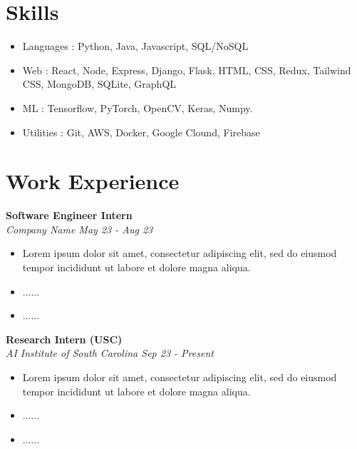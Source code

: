 \documentclass{article}
\begin{document}
\vspace{.1in}
\noindent
\begin{minipage}[t]{0.49\textwidth}

\section*{Skills}
\noindent
\begin{itemize}
    \item Languages : Python, Java, Javascript, SQL/NoSQL
    \item Web : React, Node, Express, Django, Flask, HTML, CSS, Redux, Tailwind CSS, MongoDB, SQLite, GraphQL
    \item ML : Tensorflow, PyTorch, OpenCV, Keras, Numpy.
    \item Utilities : Git, AWS, Docker, Google Clound, Firebase 
\end{itemize} 

\vspace{-.1in}

\section*{Work Experience}
\noindent
\textbf{Software Engineer Intern}\\
\textit{Company Name \hfill May 23 - Aug 23}
\begin{itemize}
    \item Lorem ipsum dolor sit amet, consectetur adipiscing elit, sed do eiusmod tempor incididunt ut labore et dolore magna aliqua. 
    \item ......
    \item ......
\end{itemize}

\textbf{Research Intern (USC)}\\
\textit{AI Institute of South Carolina \hfill Sep 23 - Present}
\begin{itemize}
   \item Lorem ipsum dolor sit amet, consectetur adipiscing elit, sed do eiusmod tempor incididunt ut labore et dolore magna aliqua. 
    \item ......
    \item ......
\end{itemize}


\end{minipage}
\hspace{0.02\textwidth}%
\end{document}
